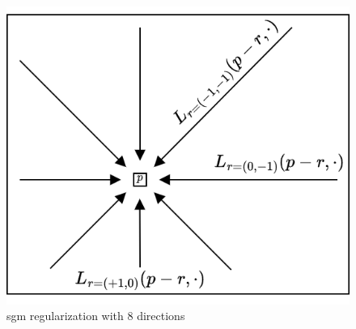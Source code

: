 \begin{figure}
	\centering
	\includegraphics[width=0.5\linewidth]{Images/Chap_1/SGM_directions.png}
	\caption{\acrshort{sgm} regularization with $8$ directions}
	\label{fig:sgm_directions}
\end{figure}

